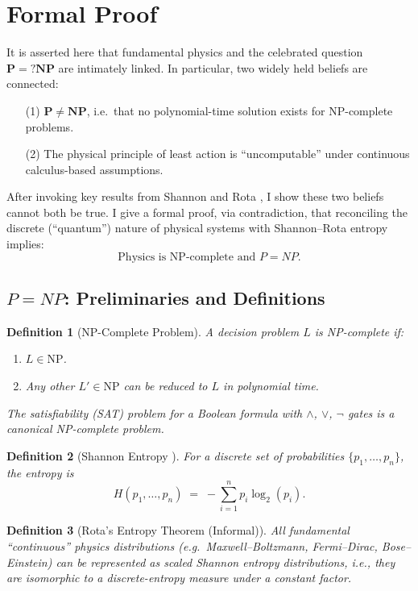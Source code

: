 \documentclass{report}
\newtheorem{definition}{Definition}
\begin{document}
\section*{Formal Proof}
It is asserted here that fundamental physics and the celebrated question \(\mathbf{P=?NP}\) are intimately linked. 
In particular, two widely held beliefs are connected:
\begin{itemize}
    \item[(1)] \(\mathbf{P \neq NP}\), i.e.\ that no polynomial-time solution exists for NP-complete problems.
    \item[(2)] The physical principle of least action is ``uncomputable'' under continuous calculus-based assumptions.
\end{itemize}
After invoking key results from Shannon \cite{shannon1948mathematical, shannon1937relay} and Rota \cite{RotaBaclawski}, I show these two beliefs cannot both be true. 
I give a formal proof, via contradiction, that reconciling the discrete (``quantum'') nature of physical systems with Shannon--Rota entropy implies:
\[
\boxed{ \text{Physics is NP-complete and } P = NP. }
\]

\subsection{$P=NP$: Preliminaries and Definitions}

\begin{definition}[NP-Complete Problem]
A decision problem \(L\) is \emph{NP-complete} if:
\begin{enumerate}
    \item \(L \in \text{NP}\).
    \item Any other \(L' \in \text{NP}\) can be reduced to \(L\) in polynomial time.
\end{enumerate}
The satisfiability (\textsc{SAT}) problem for a Boolean formula with \(\wedge\), \(\vee\), \(\neg\) gates is a canonical NP-complete problem.
\end{definition}

\begin{definition}[Shannon Entropy \cite{shannon1948mathematical}]
For a discrete set of probabilities \(\{p_1,\dots,p_n\}\), the \emph{entropy} is
\[
H(p_1,\dots,p_n) \;=\; - \sum_{i=1}^n p_i \log_2(p_i).
\]
\end{definition}

\begin{definition}[Rota's Entropy Theorem (Informal)]
\label{def:rota-thm}
All fundamental ``continuous'' physics distributions (e.g.\ Maxwell--Boltzmann, Fermi--Dirac, Bose--Einstein) can be represented as scaled Shannon entropy distributions, i.e., they are isomorphic to a discrete-entropy measure under a constant factor.
\end{definition}
\end{document}
